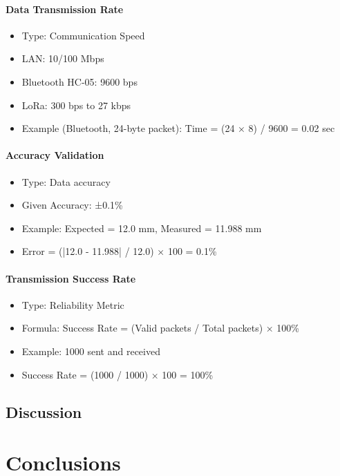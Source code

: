 \documentclass[12pt]{report}
\begin{document}
\subsubsection{Data Transmission Rate}
\begin{itemize}
    \item Type: Communication Speed
    \item LAN: 10/100 Mbps
    \item Bluetooth HC-05: 9600 bps
    \item LoRa: 300 bps to 27 kbps
    \item Example (Bluetooth, 24-byte packet): Time = (24 × 8) / 9600 = 0.02 sec
\end{itemize}

\subsubsection{Accuracy Validation}
\begin{itemize}
    \item Type: Data accuracy
    \item Given Accuracy: ±0.1\%
    \item Example: Expected = 12.0 mm, Measured = 11.988 mm
    \item Error = (|12.0 - 11.988| / 12.0) × 100 = 0.1\%
\end{itemize}

\subsubsection{Transmission Success Rate}
\begin{itemize}
    \item Type: Reliability Metric
    \item Formula: Success Rate = (Valid packets / Total packets) × 100\%
    \item Example: 1000 sent and received
    \item Success Rate = (1000 / 1000) × 100 = 100\%
\end{itemize}

\section{Discussion}

\chapter{Conclusions}
\end{document}
